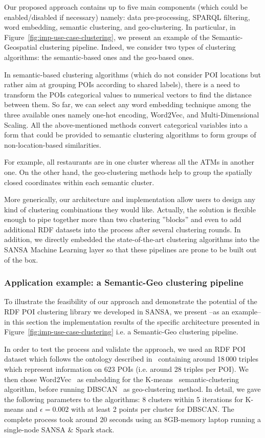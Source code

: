 Our proposed approach contains up to five main components (which could be enabled/disabled if necessary) namely: data pre-processing, \gls{SPARQL} filtering, word embedding, semantic clustering, and geo-clustering.
In particular, in Figure~\ref{fig:imp-use-case-clustering}, we present an example of the Semantic-Geospatial clustering pipeline.
Indeed, we consider two types of clustering algorithms: the semantic-based ones and the geo-based ones.

In semantic-based clustering algorithms (which do not consider \gls{POI} locations but rather aim at grouping \gls{POI}s according to shared labels), there is a need to transform the \gls{POI}s categorical values to numerical vectors to find the distance between them. 
So far, we can select any word embedding technique among the three available ones namely one-hot encoding, Word2Vec, and Multi-Dimensional Scaling.
All the above-mentioned methods convert categorical variables into a form that could be provided to semantic clustering algorithms to form groups of non-location-based similarities.

For example, all restaurants are in one cluster whereas all the ATMs in another one.
On the other hand, the geo-clustering methods help to group the spatially closed coordinates within each semantic cluster.

More generically, our architecture and implementation allow users to design any kind of clustering combinations they would like. Actually, the solution is flexible enough to pipe together more than two clustering ''blocks'' and even to add additional \gls{RDF} datasets into the process after several clustering rounds. 
In addition, we directly embedded the state-of-the-art clustering algorithms into the SANSA Machine Learning layer so that these pipelines are prone to be built out of the box.


\subsubsection{Application example: a Semantic-Geo clustering pipeline}
To illustrate the feasibility of our approach and demonstrate the potential of the \gls{RDF} \gls{POI} clustering library we developed in SANSA, we present --as an example-- in this section the implementation results of the specific architecture presented in Figure~\ref{fig:imp-use-case-clustering} i.e. a Semantic-Geo clustering pipeline.

In order to test the process and validate the approach, we used an \gls{RDF} \gls{POI} dataset which follows the ontology described in~\cite{Athanasiou2019BigPD} containing around 18\,000 triples which represent information on 623 \gls{POI}s (i.e. around 28 triples per \gls{POI}). 
We then chose Word2Vec~\cite{mikolov2013distributed} as embedding for the K-means~\cite{kmeans-algo} semantic-clustering algorithm, before running DBSCAN~\cite{ester1996density} as geo-clustering method. 
In detail, we gave the following parameters to the algorithms: 8 clusters within 5 iterations for K-means and $\epsilon=0.002$ with at least 2 points per cluster for DBSCAN.
The complete process took around 20 seconds using an 8GB-memory laptop running a single-node SANSA \& Spark stack.

